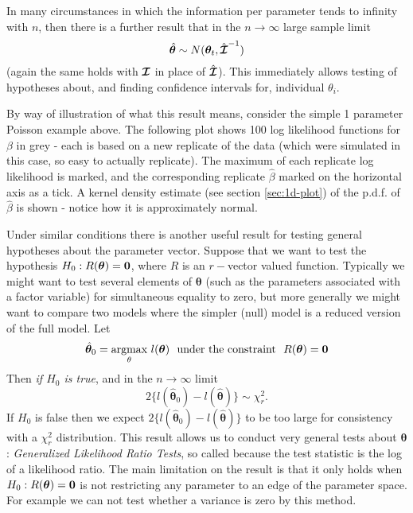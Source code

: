 \documentclass[10pt] {article}
\newcommand{\eps}[3]
{{\begin{center}
 \rotatebox{#1}{\scalebox{#2}{\texttt{[image: \#3]}}}
 \end{center}}
}
\newcommand{\beq}{\begin{equation}}
\newcommand{\eeq}{\end{equation}}
\theoremstyle{definition}
\begin{document}
In many circumstances in which the information per parameter tends to infinity with $n$, then there is a further result that in the $n \to \infty$ large sample limit
\beq
\hat {\bm \theta} \sim N({\bm \theta}_t,\hat{\bm{{\cal I}}}^{-1}) \label{mle.dist}
\eeq
(again the same holds with ${\bm{{\cal I}}}$ in place of $\hat{\bm{{\cal I}}}$). This immediately allows testing of hypotheses about, and finding confidence intervals for, individual $\theta_i$.  

By way of illustration of what this result means, consider the simple 1 parameter Poisson example above. The following plot shows 100 log likelihood functions for $\beta$ in grey - each is based on a new replicate of the data (which were simulated in this case, so easy to actually replicate). The maximum of each replicate log likelihood is marked, and the corresponding replicate $\hat \beta $ marked on the horizontal axis as a tick. A kernel density estimate (see section \ref{sec:1d-plot}) of the p.d.f. of $\hat \beta$ is shown - notice how it is approximately normal.
\eps{0}{.5}{fig-beta-dist-1.pdf}


Under similar conditions there is another useful result for testing general hypotheses about the parameter vector. Suppose that we want to test the hypothesis $H_0:R({\bm \theta}) = {\bf 0}$, where $R$ is an $r-$vector valued function. Typically we might want to test several elements of $\bm \theta$ (such as the parameters associated with a factor variable) for simultaneous equality to zero, but more generally we might want to compare two models where the simpler (null) model is a reduced version of the full model. Let
$$
\hat {\bm \theta}_0 = \underset{\theta}{\text{argmax}} ~l({\bm \theta}) ~~ \text{under the constraint} ~~ R({\bm \theta}) = {\bf 0}
$$  
Then {\em if $H_0$ is true}, and in the  $n\to \infty$ limit
\beq
2\{l(\hat {\bm \theta}_0) - l(\hat {\bm \theta})\}\sim \chi^2_r. \label{glrt}
\eeq
If $H_0$ is false then we expect $2\{l(\hat {\bm \theta}_0) - l(\hat {\bm \theta})\}$ to be too large for consistency with a $\chi^2_r$ distribution. This result allows us to conduct very general tests about $\bm \theta$: {\em Generalized Likelihood Ratio Tests}, so called because the test statistic is the log of a likelihood ratio. The main limitation on the result is that it only holds when  $H_0:R({\bm \theta}) = {\bf 0}$ is not restricting any parameter to an edge of the parameter space. For example we can not test whether a variance is zero by this method. 
\end{document}
